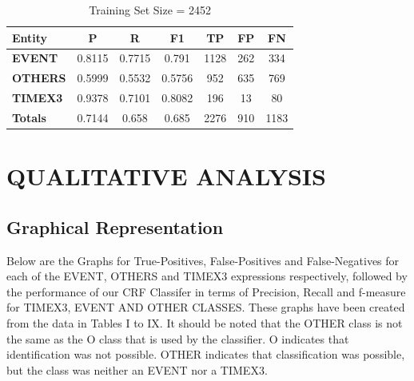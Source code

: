 \documentclass[letterpaper, 10 pt, conference]{ieeeconf}
\begin{document}
\begin{table}[!htpb]
\centering
\caption{Training Set Size = 2452}
\label{t9}
\begin{tabular}{lcccccc}
\textbf{Entity} & \textbf{P} & \textbf{R} & \textbf{F1} & \textbf{TP} & \textbf{FP} & \textbf{FN} \\
\hline
\textbf{EVENT}  & 0.8115     & 0.7715     & 0.791       & 1128        & 262         & 334         \\
\textbf{OTHERS} & 0.5999     & 0.5532     & 0.5756      & 952         & 635         & 769         \\
\textbf{TIMEX3} & 0.9378     & 0.7101     & 0.8082      & 196         & 13          & 80          \\
\textbf{Totals} & 0.7144     & 0.658      & 0.685       & 2276        & 910         & 1183       
\end{tabular}
\end{table}

\section{QUALITATIVE ANALYSIS}

\subsection{Graphical Representation}
Below are the Graphs for True-Positives, False-Positives and False-Negatives for each of the EVENT, OTHERS and TIMEX3 expressions respectively, followed by the performance of our CRF Classifer in terms of Precision, Recall and f-measure for TIMEX3, EVENT AND OTHER CLASSES. These graphs have been created from the data in Tables I to IX. It should be noted that the OTHER class is not the same as the O class that is used by the classifier. O indicates that identification was not possible. OTHER indicates that classification was possible, but the class was neither an EVENT nor a TIMEX3.
\end{document}

